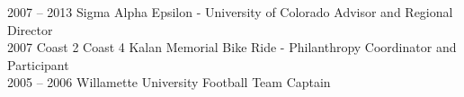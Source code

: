2007 -- 2013 \hspace{26pt} Sigma Alpha Epsilon \-- University of Colorado Advisor and Regional Director \\
2007 \hspace{58pt} Coast 2 Coast 4 Kalan Memorial Bike Ride \-- Philanthropy Coordinator and Participant \\
2005 -- 2006 \hspace{26pt} Willamette University Football Team Captain